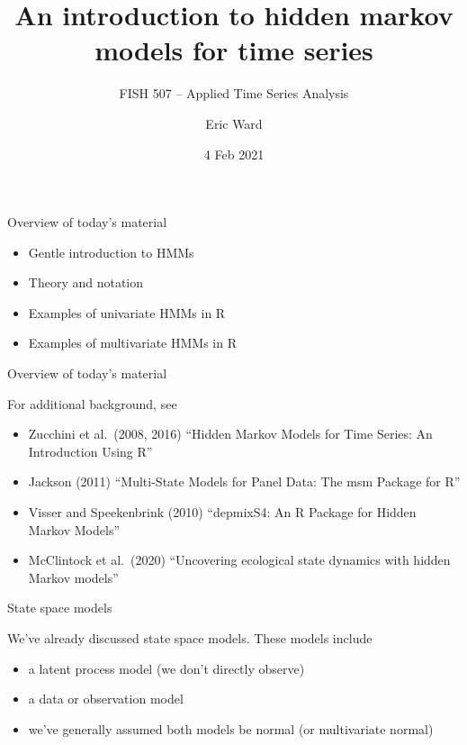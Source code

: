 \documentclass[
  ignorenonframetext,
]{beamer}
\title{An introduction to hidden markov models for time series}
\subtitle{FISH 507 -- Applied Time Series Analysis}
\author{Eric Ward}
\date{4 Feb 2021}
\begin{document}
\frame{\titlepage}

\begin{frame}{Overview of today's material}
\protect\hypertarget{overview-of-todays-material}{}

\begin{itemize}
\item
  Gentle introduction to HMMs
\item
  Theory and notation
\item
  Examples of univariate HMMs in R
\item
  Examples of multivariate HMMs in R
\end{itemize}

\end{frame}

\begin{frame}{Overview of today's material}
\protect\hypertarget{overview-of-todays-material-1}{}

For additional background, see

\begin{itemize}
\item
  Zucchini et al.~(2008, 2016) ``Hidden Markov Models for Time Series:
  An Introduction Using R''
\item
  Jackson (2011) ``Multi-State Models for Panel Data: The msm Package
  for R''
\item
  Visser and Speekenbrink (2010) ``depmixS4: An R Package for Hidden
  Markov Models''
\item
  McClintock et al.~(2020) ``Uncovering ecological state dynamics with
  hidden Markov models''
\end{itemize}

\end{frame}

\begin{frame}{State space models}
\protect\hypertarget{state-space-models}{}

We've already discussed state space models. These models include

\begin{itemize}
\item
  a latent process model (we don't directly observe)
\item
  a data or observation model
\item
  we've generally assumed both models be normal (or multivariate normal)
\end{itemize}

\end{frame}
\end{document}
